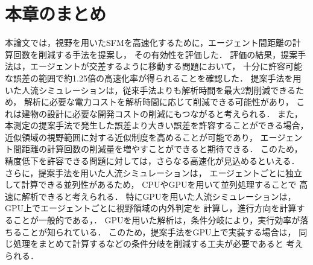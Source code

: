 \section{本章のまとめ}%
本論文では，視野を用いたSFMを高速化するために，エージェント間距離の計算回数を削減する手法を提案し，
その有効性を評価した．
評価の結果，提案手法は，エージェントが交差するように移動する問題において，
十分に許容可能な誤差の範囲で約1.25倍の高速化率が得られることを確認した．
提案手法を用いた人流シミュレーションは，従来手法よりも解析時間を最大2割削減できるため，
解析に必要な電力コストを解析時間に応じて削減できる可能性があり，
これは建物の設計に必要な開発コストの削減にもつながると考えられる．
また，本測定の提案手法で発生した誤差より大きい誤差を許容することができる場合，
近似領域の視野範囲に対する近似制度を高めることが可能であり，
エージェント間距離の計算回数の削減量を増やすことができると期待できる．
このため，精度低下を許容できる問題に対しては，さらなる高速化が見込めるといえる．
さらに，提案手法を用いた人流シミュレーションは，
エージェントごとに独立して計算できる並列性があるため，
CPUやGPUを用いて並列処理することで
高速に解析できると考えられる．
特にGPUを用いた人流シミュレーションは，GPU上でエージェントごとに視野領域の内外判定を
計算し，進行方向を計算することが一般的である\cite{seru_sfm1}，\cite{seru_sfm2}．
GPUを用いた解析は，条件分岐により，実行効率が落ちることが知られている．
このため，提案手法をGPU上で実装する場合は，
同じ処理をまとめて計算するなどの条件分岐を削減する工夫が必要であると
考えられる．


